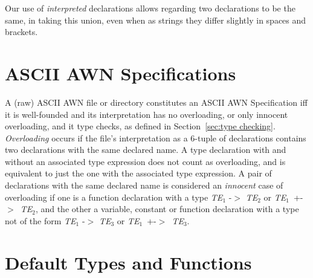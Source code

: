 \documentclass[adraft]{eptcs}
\newcommand{\sect}[1]{Section~\ref{sec:#1}}
\begin{document}
Our use of \emph{interpreted} declarations allows regarding two declarations to be the same, in taking
this union, even when as strings they differ slightly in spaces and brackets.

\section{ASCII AWN Specifications}

A (raw) ASCII AWN file or directory constitutes an ASCII AWN Specification iff it is well-founded
and its interpretation has no overloading, or only
innocent overloading, and it type checks, as defined in \sect{type checking}.
\emph{Overloading} occurs if the file's interpretation as a 6-tuple of declarations
contains two declarations with the same declared name.
A type declaration with and without an associated type expression does not count as overloading, and
is equivalent to just the one with the associated type expression.
A pair of declarations with the same declared name is considered an \emph{innocent} case of
overloading if one is a function declaration with a type
 \textit{TE}$_1$ -$>$ \textit{TE}$_2$ or \mbox{\textit{TE}$_1$ +-$>$ \textit{TE}$_2$},
and the other a variable, constant or function declaration with a type not of the form
 \textit{TE}$_1$ -$>$ \textit{TE}$_3$ or \mbox{\textit{TE}$_1$ +-$>$ \textit{TE}$_3$}.

\section{Default Types and Functions}
\end{document}
